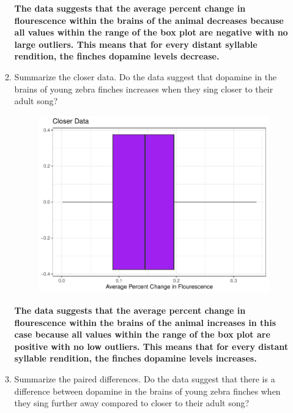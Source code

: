 \documentclass{article}\usepackage[]{graphicx}\usepackage[]{xcolor}
\begin{document}
\begin{enumerate}
\begin{enumerate}
\begin{figure}[H]
\begin{center}
    \caption{}
    \label{moe}
  \end{center}
\end{figure}
    \textbf{The data suggests that the average percent change in flourescence within  the brains of the animal decreases because all values within the range of the box plot are negative with no large outliers. This means that for every distant syllable rendition, the finches dopamine levels decrease.}
   \item Summarize the closer data. Do the data suggest that
   dopamine in the brains of young zebra finches increases when
   they sing closer to their adult song?
    \begin{figure}[H]
  \begin{center}
    \includegraphics[scale=0.35]{closer.pdf}
    \caption{}
    \label{moe}
  \end{center}
\end{figure}
    \textbf{The data suggests that the average percent change in flourescence within the brains of the animal increases in this case because all values within the range of the box plot are positive with no low outliers. This means that for every distant syllable rendition, the finches dopamine levels increases.}
  \item Summarize the paired differences. Do the data suggest
  that there is a difference between dopamine in the brains of
  young zebra finches when they sing further away compared to 
  closer to their adult song?
     \begin{figure}[H]
  \begin{center}

\end{center}
\end{figure}
\end{enumerate}
\end{enumerate}
\end{document}
